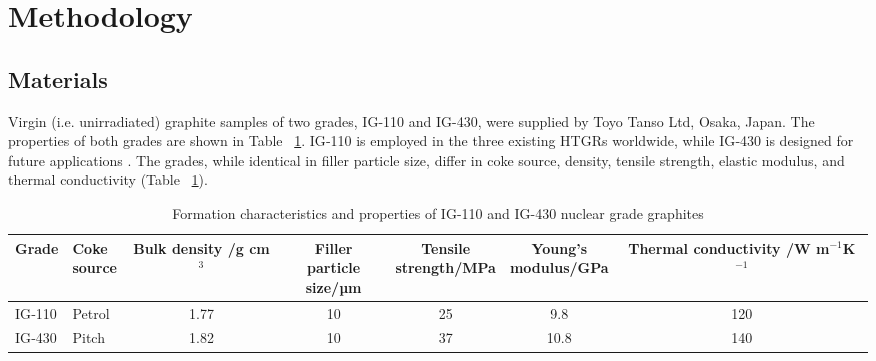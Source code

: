 \documentclass[review]{elsarticle}
\begin{document}


\section{Methodology}

\subsection{Materials}

Virgin (i.e. unirradiated) graphite samples of two grades, IG-110 and IG-430,
were supplied by Toyo Tanso Ltd, Osaka, Japan. The properties of both grades are
shown in Table ~\ref{tab:materialstable}. IG‑110 is employed in the three
existing HTGRs worldwide, while IG‑430 is designed for future applications
\citep{toyotanso_atomic_nuclear}. The grades, while identical in filler particle
size, differ in coke source, density, tensile strength, elastic modulus, and
thermal conductivity (Table ~\ref{tab:materialstable}).

\begin{table}[htbp]
  \centering
  \caption{Formation characteristics and properties of IG-110 and IG-430 nuclear grade graphites \citep{ARREGUIMENA2022112047,Jones2018}}
  \label{tab:materialstable}
    \begin{tabular}{l l c c c c c}
      \hline
      Grade   & \makecell{Coke \\ source} & \makecell{Bulk density \\ /g cm$^3$} & \makecell{Filler particle \\ size/µm} & \makecell{Tensile \\ strength/MPa} & \makecell{Young's \\ modulus/GPa} & \makecell{Thermal \\ conductivity \\ /W m$^{-1}$K$^{-1}$}\\
      \hline
      IG‑110  & Petrol          & 1.77                  & 10                           & 25                     & 9.8                   & 120 \\
      IG‑430  & Pitch           & 1.82                  & 10                           & 37                     & 10.8                  & 140 \\
      \hline
    \end{tabular}%
\end{table}
\end{document}
